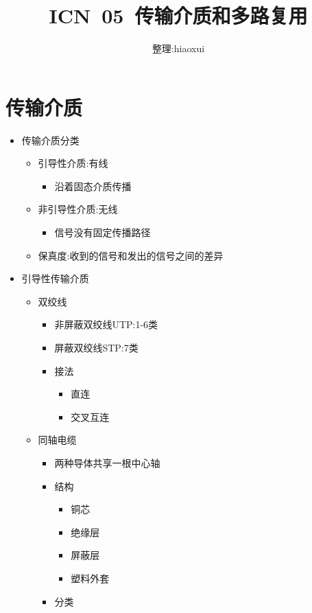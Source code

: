 \documentclass[a4paper,12pt,notitlepage]{article}
\begin{document}
\title{ICN\ 05\ 传输介质和多路复用}
\author{整理:hiaoxui}
\maketitle

\section{传输介质} 

\begin{itemize}
	\item 传输介质分类
	\begin{itemize}
		\item 引导性介质:有线
		\begin{itemize}
			\item 沿着固态介质传播
		\end{itemize}
		\item 非引导性介质:无线
		\begin{itemize}
			\item 信号没有固定传播路径
		\end{itemize}
		\item 保真度:收到的信号和发出的信号之间的差异
	\end{itemize}
	\item 引导性传输介质
	\begin{itemize}
		\item 双绞线
		\begin{itemize}
			\item 非屏蔽双绞线UTP:1-6类
			\item 屏蔽双绞线STP:7类
			\item 接法
			\begin{itemize}
				\item 直连
				\item 交叉互连
			\end{itemize}
		\end{itemize}
		\item 同轴电缆
		\begin{itemize}
			\item 两种导体共享一根中心轴
			\item 结构
			\begin{itemize}
				\item 铜芯
				\item 绝缘层
				\item 屏蔽层
				\item 塑料外套
			\end{itemize}
			\item 分类

\end{itemize}
\end{itemize}
\end{itemize}
\end{document}
